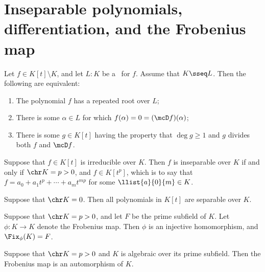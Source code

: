 \documentclass{article}
\begin{document}
\section{Inseparable polynomials, differentiation, and the Frobenius map}
  \begin{ttheorem}
    Let \( f\in K[t]\setminus K \), and let \( L:K \) be a \sfe~for \( f \). Assume that \( K\sseq L \). Then the following are equivalent:
    \begin{enumerate}[label=(\roman*)]
      \item The polynomial \( f \) has a repeated root over \( L \);
      \item There is some \( \alpha\in L \) for which \( f(\alpha)=0=(\mcD f)(\alpha) \);
      \item There is some \( g\in K[t] \) having the property that \( \deg g\geq 1 \) and \( g \) divides both \( f \) and \( \mcD f \).
    \end{enumerate}
  \end{ttheorem}

  \begin{ttheorem}
    Suppose that \( f\in K[t] \) is irreducible over \( K \). Then \( f \) is inseparable over \( K \) if and only if \( \chr K=p>0 \), and \( f \in K[t^p] \), which is to say that \( f=a_0+a_1t^p+\cdots+a_mt^{mp} \) for some \( \llist{a}{0}{m}\in K \).
  \end{ttheorem}

  \begin{tcorollary}
    Suppose that \( \chr K = 0 \). Then all polynomials in \( K[t] \) are separable over \( K \).
  \end{tcorollary}

  \begin{ttheorem}
    Suppose that \( \chr K = p>0 \), and let \( F \) be the prime subfield of \( K \). Let \( \phi:K\to K \) denote the Frobenius map. Then \( \phi \) is an injective homomorphism, and \( \Fix_\phi(K) = F \).
  \end{ttheorem}

  \begin{tcorollary}
    Suppose that \( \chr K = p > 0 \) and \( K \) is algebraic over its prime subfield. Then the Frobenius map is an automorphism of \( K \).
  \end{tcorollary}
\end{document}
